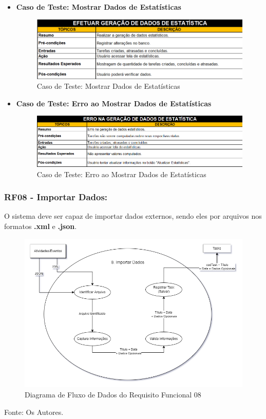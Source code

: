 \documentclass[a4paper,12pt]{article}
\begin{document}
\pagebreak
\begin{itemize}
	\item\textbf{Caso de Teste: Mostrar Dados de Estatísticas}
	\begin{figure}[H]
		\centering
		\includegraphics[scale=0.32]{UnitTest/trueCase/stats.png}
		\caption{Caso de Teste: Mostrar Dados de Estatísticas}
	\end{figure}

	\item\textbf{Caso de Teste: Erro ao Mostrar Dados de Estatísticas}
	\begin{figure}[H]
		\centering
		\includegraphics[scale=0.32]{UnitTest/falseCase/stats.png}
		\caption{Caso de Teste: Erro ao Mostrar Dados de Estatísticas}
	\end{figure}
\end{itemize}

\pagebreak
\subsubsection{RF08 - Importar Dados:}
O sistema deve ser capaz de importar dados externos, sendo eles por arquivos nos formatos \textbf{.xml} e \textbf{.json}.
\begin{figure}[H]
	\centering
	\includegraphics[scale=0.45]{DFDs/RF08.drawio.png}
	\caption{Diagrama de Fluxo de Dados do Requisito Funcional 08}
\end{figure}
\noindent Fonte: Os Autores.
\end{document}
